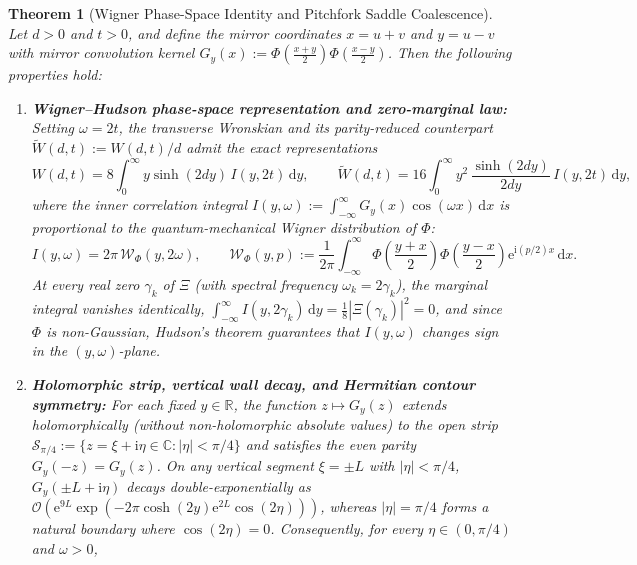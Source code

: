 \documentclass[11pt,a4paper,reqno]{amsart}
\newtheorem{theorem}{Theorem}[section]
\theoremstyle{definition}
\theoremstyle{remark}
\numberwithin{equation}{section}
\newcommand{\dd}{\mathrm{d}}
\newcommand{\ii}{\mathrm{i}}
\newcommand{\ee}{\mathrm{e}}
\newcommand{\Wig}{\mathcal{W}}
\newcommand{\Wtil}{\widetilde{W}}
\begin{document}
\begin{theorem}[Wigner Phase-Space Identity and Pitchfork Saddle Coalescence]\label{thm:main}
Let $d > 0$ and $t > 0$, and define the mirror coordinates $x = u + v$ and $y = u - v$ with mirror convolution kernel $G_y(x) := \Phi\!\left(\frac{x+y}{2}\right)\Phi\!\left(\frac{x-y}{2}\right)$. Then the following properties hold:
\begin{enumerate}
\item[\textup{(i)}] \textbf{Wigner--Hudson phase-space representation and zero-marginal law:} Setting $\omega = 2t$, the transverse Wronskian and its parity-reduced counterpart $\Wtil(d,t) := W(d,t)/d$ admit the exact representations
\begin{equation}\label{eq:W_mirror_thm}
W(d,t) = 8\int_0^\infty y\sinh(2d y)\,I(y,2t)\,\dd y, \qquad \Wtil(d,t) = 16\int_0^\infty y^2\,\frac{\sinh(2d y)}{2d y}\,I(y,2t)\,\dd y,
\end{equation}
where the inner correlation integral $I(y,\omega) := \int_{-\infty}^\infty G_y(x)\cos(\omega x)\,\dd x$ is proportional to the quantum-mechanical Wigner distribution of $\Phi$:
\begin{equation}\label{eq:Wigner_thm}
I(y,\omega) = 2\pi\,\Wig_\Phi(y, 2\omega), \qquad \Wig_\Phi(y,p) := \frac{1}{2\pi}\int_{-\infty}^\infty \Phi\!\left(\frac{y+x}{2}\right)\Phi\!\left(\frac{y-x}{2}\right)\ee^{\ii (p/2) x}\,\dd x.
\end{equation}
At every real zero $\gamma_k$ of $\Xi$ (with spectral frequency $\omega_k = 2\gamma_k$), the marginal integral vanishes identically, $\int_{-\infty}^\infty I(y,2\gamma_k)\,\dd y = \frac{1}{8}|\Xi(\gamma_k)|^2 = 0$, and since $\Phi$ is non-Gaussian, Hudson's theorem guarantees that $I(y,\omega)$ changes sign in the $(y,\omega)$-plane.
\item[\textup{(ii)}] \textbf{Holomorphic strip, vertical wall decay, and Hermitian contour symmetry:} For each fixed $y \in \mathbb{R}$, the function $z \mapsto G_y(z)$ extends holomorphically (without non-holomorphic absolute values) to the open strip $\mathcal{S}_{\pi/4} := \{z = \xi + \ii\eta \in \mathbb{C} : |\eta| < \pi/4\}$ and satisfies the even parity $G_y(-z) = G_y(z)$. On any vertical segment $\xi = \pm L$ with $|\eta| < \pi/4$, $G_y(\pm L + \ii\eta)$ decays double-exponentially as $\mathcal{O}(\ee^{9L}\exp(-2\pi\cosh(2y)\ee^{2L}\cos(2\eta)))$, whereas $|\eta| = \pi/4$ forms a natural boundary where $\cos(2\eta) = 0$. Consequently, for every $\eta \in (0, \pi/4)$ and $\omega > 0$,
\begin{equation}\label{eq:shifted_I_thm}

\end{equation}
\end{enumerate}
\end{theorem}
\end{document}
